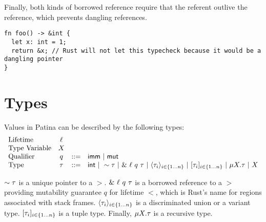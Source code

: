 Finally, both kinds of borrowed reference require that the referent outlive the reference,
which prevents dangling references.
\begin{verbatim}
fn foo() -> &int {
  let x: int = 1;
  return &x; // Rust will not let this typecheck because it would be a dangling pointer
}
\end{verbatim}

\section*{Types}
Values in Patina can be described by the following types:
\[
\begin{array}{lccl}
\textrm{Lifetime} & \ell & & \\
\textrm{Type Variable} & X & & \\
\textrm{Qualifier} & q & ::= & \mathsf{imm} ~|~ \mathsf{mut} \\
\textrm{Type} & \tau & ::= & \mathsf{int} ~|~ \sim{\tau} ~|~ \&~{{\ell}~{q}~{\tau}} ~|~ 
				\langle{{\tau}_{i}}\rangle_{{i} \in \{1 \ldots {n}\} } ~|~ [{{\tau}_{i}}]_{{i} \in \{1 \ldots {n}\} } ~|~ 
				\mu {X}.{\tau} ~|~ X \\
\end{array}
\]

$\sim{\tau}$ is a unique pointer to a $\gt$.
$\&~{{\ell}~{q}~{\tau}}$ is a borrowed reference to a $\gt$
providing mutability guarantee $q$ for lifetime $\lt$, which is Rust's name
for regions associated with stack frames.
$\langle{{\tau}_{i}}\rangle_{{i} \in \{1 \ldots {n}\} }$ is a discriminated union or a variant type.
$[{{\tau}_{i}}]_{{i} \in \{1 \ldots {n}\} }$ is a tuple type.
Finally, $\mu {X}.{\tau}$ is a recursive type.

